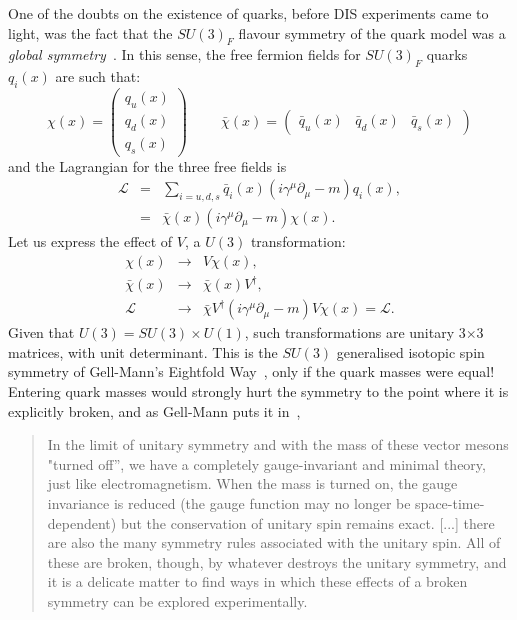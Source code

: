 One of the doubts on the existence of quarks, before DIS experiments
came to light, was the fact that the $SU(3)_{F}$ flavour symmetry of the quark
model was a \textit{global symmetry}~\cite{luigi_gauge}. In this sense, the free fermion
fields for $SU(3)_{F}$ quarks $q_{i}(x)$ are such that:
\begin{equation}
\chi(x) = \begin{pmatrix} q_{u}(x) \\ q_{d}(x) \\ q_{s}(x) \end{pmatrix}
\hspace{1cm} \bar{\chi}(x) = \begin{pmatrix} \bar{q}_{u}(x) &
  \bar{q}_{d}(x) & \bar{q}_{s}(x) \end{pmatrix}
\end{equation}
and the Lagrangian for the three free fields is 
\begin{eqnarray}
\mathcal{L} &=& \displaystyle\sum_{i=u,d,s} \bar{q}_{i}(x)\left(
  i\gamma^{\mu}\partial_{\mu} - m\right)q_{i}(x), \\
&=& \bar{\chi}(x)\left(  i\gamma^{\mu}\partial_{\mu} - m\right)\chi(x).
\end{eqnarray}
Let us express the effect of $V$, a $U(3)$ transformation:
\begin{eqnarray*}
\chi(x) &\to& V\chi(x), \\
\bar{\chi}(x) &\to& \bar{\chi}(x)V^{\dagger}, \\
\mathcal{L} &\to& \bar{\chi}V^{\dagger} \left(
  i\gamma^{\mu}\partial_{\mu} - m \right) V\chi(x) = \mathcal{L}.
\end{eqnarray*}
Given that $U(3) = SU(3) \times U(1)$, such transformations are
unitary 3$\times$3 matrices, with unit determinant. This is the
$SU(3)$ generalised isotopic spin
symmetry of Gell-Mann's Eightfold Way~\cite{eightfoldway}, only
if the quark masses were equal! Entering quark masses would strongly hurt the symmetry to the point where it is
explicitly broken, and as Gell-Mann puts it in~\cite{eightfoldway}, 
\begin{quote}
\textsf{In the limit of unitary symmetry and with the mass of these vector
mesons "turned off'', we have a completely gauge-invariant and minimal
theory, just like electromagnetism. When the mass is turned on, the
gauge invariance is reduced (the gauge function may no longer be
space-time-dependent) but the conservation of unitary spin remains
exact. [...] there are also the many symmetry rules associated with
the unitary spin. All of these are broken, though, by whatever
destroys the unitary symmetry, and it is a delicate matter to find
ways in which these effects of a broken symmetry can be explored experimentally.}
\end{quote}

